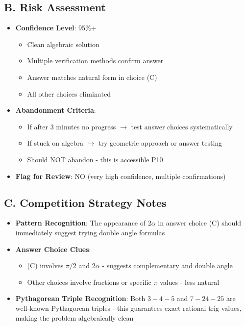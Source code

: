 \documentclass[11pt]{article}
\begin{document}
\begin{competitionbox}
\subsection*{B. Risk Assessment}
\begin{itemize}[leftmargin=*]
    \item \textbf{Confidence Level}: 95\%+
    \begin{itemize}
        \item Clean algebraic solution
        \item Multiple verification methods confirm answer
        \item Answer matches natural form in choice (C)
        \item All other choices eliminated
    \end{itemize}
    
    \item \textbf{Abandonment Criteria}: 
    \begin{itemize}
        \item If after 3 minutes no progress $\rightarrow$ test answer choices systematically
        \item If stuck on algebra $\rightarrow$ try geometric approach or answer testing
        \item Should NOT abandon - this is accessible P10
    \end{itemize}
    
    \item \textbf{Flag for Review}: NO (very high confidence, multiple confirmations)
\end{itemize}

\subsection*{C. Competition Strategy Notes}
\begin{itemize}[leftmargin=*]
    \item \textbf{Pattern Recognition}: The appearance of $2\alpha$ in answer choice (C) should immediately suggest trying double angle formulas
    
    \item \textbf{Answer Choice Clues}: 
    \begin{itemize}
        \item (C) involves $\pi/2$ and $2\alpha$ - suggests complementary and double angle
        \item Other choices involve fractions or specific $\pi$ values - less natural
    \end{itemize}
    
    \item \textbf{Pythagorean Triple Recognition}: Both $3{-}4{-}5$ and $7{-}24{-}25$ are well-known Pythagorean triples - this guarantees exact rational trig values, making the problem algebraically clean
\end{itemize}
\end{competitionbox}
\end{document}
